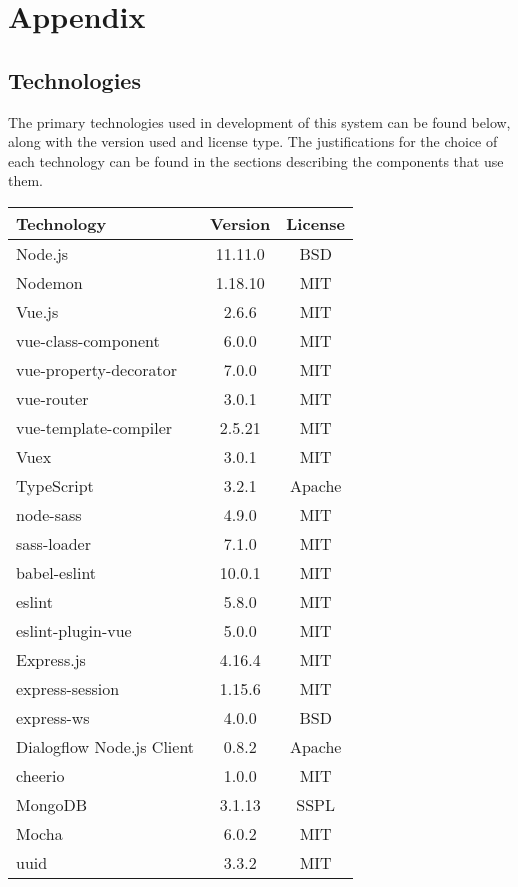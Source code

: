 \section{Appendix}

\subsection{Technologies}
The primary technologies used in development of this system can be found below, along with the version used and license type. The justifications for the choice of each technology can be found in the sections describing the components that use them.

\begin{center}
	\begin{tabular}{ | l | c | c | } 
		\hline
		\textbf{Technology} & \textbf{Version} & \textbf{License} \\ 
		\hline
		Node.js & 11.11.0 & BSD \\
		Nodemon & 1.18.10 & MIT \\
        Vue.js & 2.6.6 & MIT \\
        vue-class-component & 6.0.0 & MIT \\
        vue-property-decorator & 7.0.0 & MIT \\
        vue-router & 3.0.1 & MIT \\
        vue-template-compiler & 2.5.21 & MIT \\
        Vuex & 3.0.1 & MIT \\
        TypeScript & 3.2.1 & Apache \\
        node-sass & 4.9.0 & MIT \\
        sass-loader & 7.1.0 & MIT \\
        babel-eslint & 10.0.1 & MIT \\
        eslint & 5.8.0 & MIT \\
        eslint-plugin-vue & 5.0.0 & MIT \\
		Express.js & 4.16.4 & MIT \\
		express-session & 1.15.6 & MIT \\
		express-ws & 4.0.0 & BSD \\
		Dialogflow Node.js Client & 0.8.2 & Apache \\
        cheerio & 1.0.0 & MIT \\
		MongoDB & 3.1.13 & SSPL \\
		Mocha & 6.0.2 & MIT \\
		uuid & 3.3.2 & MIT \\
		\hline
	\end{tabular}
\end{center}

